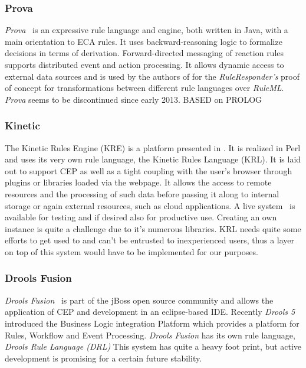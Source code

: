 \subsubsection{Prova}
\emph{Prova}~\cite{wwwprova} is an expressive rule language and engine, both written in Java, with a main orientation to ECA rules. It uses backward-reasoning logic to formalize decisions in terms of derivation. Forward-directed messaging of reaction rules supports distributed event and action processing. It allows dynamic access to external data sources and is used by the authors of \cite{2013_Zhao-Paschke_EDSWE.pdf,2007-Paschke_etal-RuleResponder.pdf} for the \emph{RuleResponder's} proof of concept for transformations between different rule languages over \emph{RuleML}. \emph{Prova} seems to be discontinued since early 2013. 
BASED on PROLOG

\subsubsection{Kinetic}
The Kinetic Rules Engine (KRE) is a platform presented in \cite{bookTheLiveWeb}. It is realized in Perl and uses its very own rule language, the Kinetic Rules Language (KRL). It is laid out to support CEP as well as a tight coupling with the user's browser through plugins or libraries loaded via the webpage. It allows the access to remote resources and the processing of such data before passing it along to internal storage or again external resources, such as cloud applications. A live system~\cite{wwwkynetx} is available for testing and if desired also for productive use. Creating an own instance is quite a challenge due to it's numerous libraries. KRL needs quite some efforts to get used to and can't be entrusted to inexperienced users, thus a layer on top of this system would have to be implemented for our purposes.

\subsubsection{Drools Fusion}
\emph{Drools Fusion}~\cite{wwwdrools} is part of the jBoss open source community and allows the application of CEP and development in an eclipse-based IDE. Recently \emph{Drools 5} introduced the Business Logic integration Platform which provides a platform for Rules, Workflow and Event Processing. \emph{Drools Fusion} has its own rule language, \emph{Drools Rule Language (DRL)} This system has quite a heavy foot print, but active development is promising for a certain future stability.

